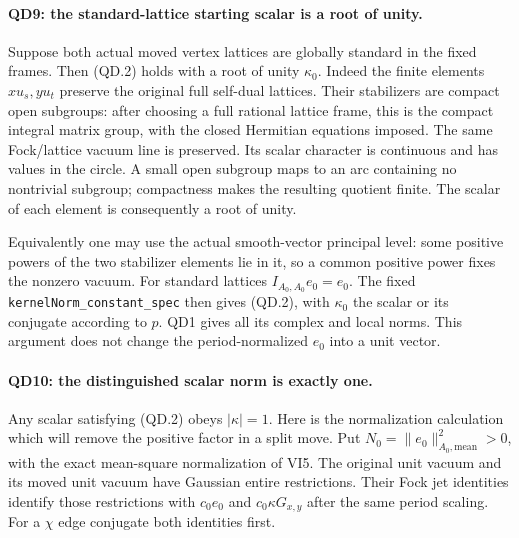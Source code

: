 \paragraph{QD9: the standard-lattice starting scalar is a root of unity.}
Suppose both actual moved vertex lattices are globally standard
in the fixed frames.  Then (QD.2) holds with a root of unity
$\kappa_0$.  Indeed the finite elements $xu_s,yu_t$ preserve
the original full self-dual lattices.  Their stabilizers are
compact open subgroups: after choosing a full rational lattice
frame, this is the compact integral matrix group, with the
closed Hermitian equations imposed.  The same Fock/lattice
vacuum line is preserved.  Its scalar character is continuous
and has values in the circle.  A small open subgroup maps to
an arc containing no nontrivial subgroup; compactness makes
the resulting quotient finite.  The scalar of each element
is consequently a root of unity.

Equivalently one may use the actual smooth-vector principal
level: some positive powers of the two stabilizer elements lie
in it, so a common positive power fixes the nonzero vacuum.
For standard lattices $I_{A_0,A_0}e_0=e_0$.  The fixed
\texttt{kernelNorm\_constant\_spec} then gives (QD.2), with
$\kappa_0$ the scalar or its conjugate according to $p$.
QD1 gives all its complex and local norms.  This argument
does not change the period-normalized $e_0$ into a unit vector.

\paragraph{QD10: the distinguished scalar norm is exactly one.}
Any scalar satisfying (QD.2) obeys $|\kappa|=1$.
Here is the normalization calculation which will remove the
positive factor in a split move.  Put
$N_0=\|e_0\|_{A_0,\mathrm{mean}}^2>0$, with the exact mean-square
normalization of VI5.  The original unit vacuum and its moved
unit vacuum have Gaussian entire restrictions.  Their Fock jet
identities identify those restrictions with
$c_0 e_0$ and $c_0\kappa G_{x,y}$ after the same period scaling.
For a $\chi$ edge conjugate both identities first.

